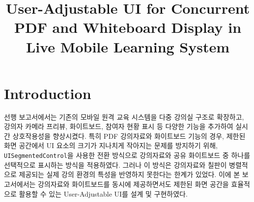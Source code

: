 \documentclass[pdflatex,sn-mathphys-num]{sn-jnl}%
\theoremstyle{thmstyleone}%
\theoremstyle{thmstyletwo}%
\theoremstyle{thmstylethree}%
\begin{document}
\title[Article Title]{User-Adjustable UI for Concurrent PDF and Whiteboard Display in Live Mobile Learning System}


\author*{ }








\maketitle

\section{Introduction}\label{sec1}

선행 보고서에서는 기존의 모바일 원격 교육 시스템을 다중 강의실 구조로 확장하고, 강의자 카메라 프리뷰, 화이트보드, 참여자 현황 표시 등 다양한 기능을 추가하여 실시간 상호작용성을 향상시켰다. 특히 PDF 강의자료와 화이트보드 기능의 경우, 제한된 화면 공간에서 UI 요소의 크기가 지나치게 작아지는 문제를 방지하기 위해, \verb+UISegmentedControl+을 사용한 전환 방식으로 강의자료와 공유 화이트보드 중 하나를 선택적으로 표시하는 방식을 적용하였다. 그러나 이 방식은 강의자료와 칠판이 병렬적으로 제공되는 실제 강의 환경의 특성을 반영하지 못한다는 한계가 있었다. 이에 본 보고서에서는 강의자료와 화이트보드를 동시에 제공하면서도 제한된 화면 공간을 효율적으로 활용할 수 있는 User-Adjustable UI를 설계 및 구현하였다.
\end{document}
